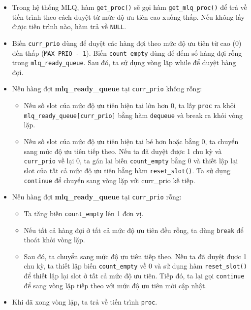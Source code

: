 \begin{itemize}
    \item Trong hệ thống MLQ, hàm \texttt{get\_proc()} sẽ gọi hàm \texttt{get\_mlq\_proc()} để trả về tiến trình theo cách duyệt từ mức độ ưu tiên cao xuống thấp. Nếu không lấy được tiến trình nào, hàm trả về \texttt{NULL}.
    \item Biến \texttt{curr\_prio} dùng để duyệt các hàng đợi theo mức độ ưu tiên từ cao (0) đến thấp (\texttt{MAX\_PRIO - 1}). Biến \texttt{count\_empty} dùng để đếm số hàng đợi rỗng trong \texttt{mlq\_ready\_queue}. Sau đó, ta sử dụng vòng lặp while để duyệt hàng đợi.
    \item Nếu hàng đợi \textbf{mlq\_ready\_queue} tại \texttt{curr\_prio} không rỗng:
    \begin{itemize}
        \item Nếu số slot của mức độ ưu tiên hiện tại lớn hơn 0, ta lấy \texttt{proc} ra khỏi \texttt{mlq\_ready\_queue[curr\_prio]} bằng hàm \texttt{dequeue} và break ra khỏi vòng lặp.
        \item Nếu số slot của mức độ ưu tiên hiện tại bé hơn hoặc bằng 0, ta chuyển sang mức độ ưu tiên tiếp theo. Nếu ta đã duyệt được 1 chu kỳ và \texttt{curr\_prio} về lại 0, ta gán lại biến \texttt{count\_empty} bằng 0 và thiết lập lại slot của tất cả mức độ ưu tiên bằng hàm \texttt{reset\_slot()}. Ta sử dụng \texttt{continue} để chuyển sang vòng lặp với curr\_prio kế tiếp.
    \end{itemize}
    \item Nếu hàng đợi \textbf{mlq\_ready\_queue} tại \texttt{curr\_prio} rỗng:
    \begin{itemize}
        \item Ta tăng biến \texttt{count\_empty} lên 1 đơn vị.
        \item Nếu tất cả hàng đợi ở tất cả mức độ ưu tiên đều rỗng, ta dùng \texttt{break} để thoát khỏi vòng lặp.
        \item Sau đó, ta chuyển sang mức độ ưu tiên tiếp theo. Nếu ta đã duyệt được 1 chu kỳ, ta thiết lập biến \texttt{count\_empty} về 0 và sử dụng hàm \texttt{reset\_slot()} để thiết lập lại slot ở tất cả mức độ ưu tiên. Tiếp đó, ta lại gọi \texttt{continue} để sang vòng lặp tiếp theo với mức độ ưu tiên mới cập nhật.
    \end{itemize}
    \item Khi đã xong vòng lặp, ta trả về tiến trình \texttt{proc}.
\end{itemize}

